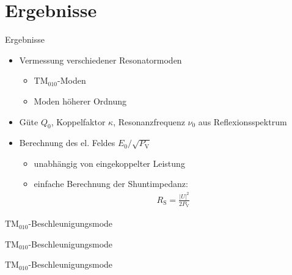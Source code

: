 \documentclass[12pt,xcolor=dvipsnames,professionalfonts]{beamer}
\begin{document}
\section{Ergebnisse}
\begin{frame}{Ergebnisse}
	\begin{itemize}
		\setlength\itemsep{1.25em}
		\item Vermessung verschiedener Resonatormoden	
		\begin{itemize}
			\setlength\itemsep{0.25em}
			\item $\mathrm{TM}_{010}$-Moden
			\item Moden höherer Ordnung
		\end{itemize}
		
		\item Güte $Q_0$, Koppelfaktor $\kappa$, Resonanzfrequenz $\nu_0$ aus Reflexionsspektrum
		
		\item Berechnung des el. Feldes $E_0 / \sqrt{P_\mathrm{V}}$
		\begin{itemize}
			\setlength\itemsep{0.25em}
			\item unabhängig von eingekoppelter Leistung
			\item einfache Berechnung der Shuntimpedanz:
			\begin{align*}
			R_\mathrm{S} = \frac{|U|^2}{2 P_\mathrm{V}}
			\end{align*}
			
		\end{itemize}
	\end{itemize}
\end{frame}

\begin{frame}{$\text{TM}_{010}$-Beschleunigungsmode}
	\centering
	
\end{frame}
\begin{frame}{$\text{TM}_{010}$-Beschleunigungsmode}
	\centering
	
\end{frame}
\begin{frame}{$\text{TM}_{010}$-Beschleunigungsmode}
	\addtocounter{framenumber}{-1}
	\centering
	
\end{frame}
\end{document}
